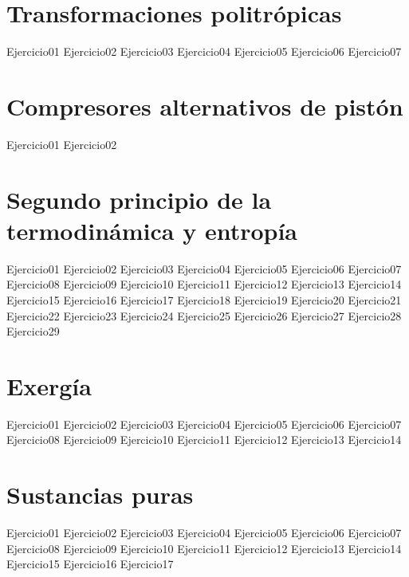 \documentclass[10pt,a4paper,oneside]{book}
\begin{document}
\chapter{Transformaciones politrópicas}
{Ejercicio01}
{Ejercicio02}
{Ejercicio03}
{Ejercicio04}
{Ejercicio05}
{Ejercicio06}
{Ejercicio07}
\chapter{Compresores alternativos de pistón}
{Ejercicio01}
{Ejercicio02}
\chapter{Segundo principio de la termodinámica y entropía}
{Ejercicio01}
{Ejercicio02}
{Ejercicio03}
{Ejercicio04}
{Ejercicio05}
{Ejercicio06}
{Ejercicio07}
{Ejercicio08}
{Ejercicio09}
{Ejercicio10}
{Ejercicio11}
{Ejercicio12}
{Ejercicio13}
{Ejercicio14}
{Ejercicio15}
{Ejercicio16}
{Ejercicio17}
{Ejercicio18}
{Ejercicio19}
{Ejercicio20}
{Ejercicio21}
{Ejercicio22}
{Ejercicio23}
{Ejercicio24}
{Ejercicio25}
{Ejercicio26}
{Ejercicio27}
{Ejercicio28}
{Ejercicio29}
\chapter{Exergía}
{Ejercicio01}
{Ejercicio02}
{Ejercicio03}
{Ejercicio04}
{Ejercicio05}
{Ejercicio06}
{Ejercicio07}
{Ejercicio08}
{Ejercicio09}
{Ejercicio10}
{Ejercicio11}
{Ejercicio12}
{Ejercicio13}
{Ejercicio14}
\chapter{Sustancias puras}
{Ejercicio01}
{Ejercicio02}
{Ejercicio03}
{Ejercicio04}
{Ejercicio05}
{Ejercicio06}
{Ejercicio07}
{Ejercicio08}
{Ejercicio09}
{Ejercicio10}
{Ejercicio11}
{Ejercicio12}
{Ejercicio13}
{Ejercicio14}
{Ejercicio15}
{Ejercicio16}
{Ejercicio17}
\end{document}
